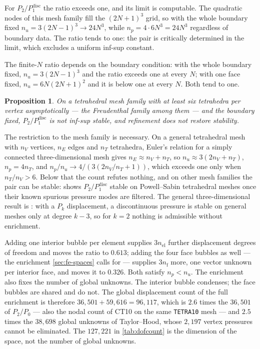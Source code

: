 \documentclass{article}
\newcommand{\code}[1]{\texttt{#1}}
\theoremstyle{definition}
\theoremstyle{plain}
\newtheorem{proposition}{Proposition}
\begin{document}
For $P_2/P_1^{\mathrm{disc}}$ the ratio exceeds one, and its limit is
computable. The quadratic nodes of this mesh family fill the $(2N+1)^3$
grid, so with the whole boundary fixed $n_u = 3(2N-1)^3 \to 24N^3$, while
$n_p = 4 \cdot 6N^3 = 24N^3$ regardless of boundary data. The ratio tends to
one: the pair is critically determined in the limit, which excludes a uniform
inf-sup constant.

The finite-$N$ ratio depends on the boundary condition: with the whole
boundary fixed, $n_u = 3(2N-1)^3$ and the ratio exceeds one at every $N$; with
one face fixed, $n_u = 6N(2N+1)^2$ and it is below one at every $N$. Both tend
to one.

\begin{proposition}
On a tetrahedral mesh family with at least six tetrahedra per vertex
asymptotically --- the Freudenthal family among them --- and the boundary
fixed, $P_2/P_1^{\mathrm{disc}}$ is not inf-sup stable, and refinement does not
restore stability.
\end{proposition}

The restriction to the mesh family is necessary. On a general tetrahedral mesh
with $n_V$ vertices, $n_E$ edges and $n_T$ tetrahedra, Euler's relation for a
simply connected three-dimensional mesh gives $n_E \approx n_V + n_T$, so
$n_u \approx 3(2n_V + n_T)$, $n_p = 4n_T$, and
$n_p/n_u \to 4/(3(2n_V/n_T + 1))$, which exceeds one only when
$n_T/n_V > 6$. Below that the count refutes nothing, and on other mesh families
the pair can be stable: \textcite{Zhang:2011} shows $P_2/P_1^{\mathrm{disc}}$ stable on Powell--Sabin
tetrahedral meshes once their known spurious pressure modes are filtered. The
general three-dimensional result is \textcite[Remark~8.6.2]{BoffiBrezziFortin:2013}:
with a $P_k$ displacement, a discontinuous pressure is stable on general meshes
only at degree $k - 3$, so for $k = 2$ nothing is admissible without enrichment.

Adding one interior bubble per element supplies $3n_{\mathrm{el}}$ further
displacement degrees of freedom and moves the ratio to $0.613$; adding the four
face bubbles as well --- the enrichment \cref{sec:fe-spaces} calls for ---
supplies $3n_{\mathrm{f}}$ more, one vector unknown per interior face,
and moves it to $0.326$. Both satisfy $n_p < n_u$. The enrichment also fixes
the number of global unknowns. The interior bubble
condenses; the face bubbles are shared and do not. The global displacement
count of the full enrichment is therefore $36{,}501 + 59{,}616 = 96{,}117$,
which is $2.6$ times the $36{,}501$ of $P_2/P_0$ --- also the nodal count of
CT10 on the same \code{TETRA10} mesh --- and $2.5$ times
the $38{,}698$ global unknowns of Taylor--Hood, whose $2{,}197$ vertex pressures
cannot be eliminated. The $127{,}221$ in \cref{tab:dofcount} is the
dimension of the space, not the number of global unknowns.
\end{document}
